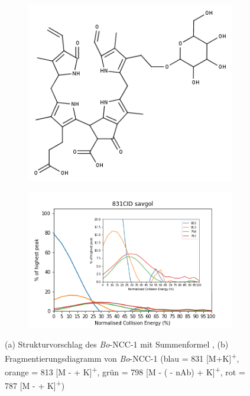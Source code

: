 \begin{figure}[!htbp]
  \begin{subfigure}[b]{0.5\textwidth}
    \includegraphics[width=\textwidth]{figures/Kapitel4/Kataboliten/fragmentation_structures/VWA_Katabolit_831.png}
    \caption{}
    \label{fig:831MKLeafspraystructure}
  \end{subfigure}
  \hfill
  \begin{subfigure}[b]{0.7\textwidth}
    \includegraphics[width=\textwidth]{figures/Kapitel4/Kataboliten/diags/831CID-savgol.png}
    \caption{}
    \label{fig:831MKLeafspraydiags}
  \end{subfigure}
  \caption[Strukturvorschlag von \textit{Bo}-NCC-1 und Fragmentierungsdiagramm, Quelle: Autor]{(a) Strukturvorschlag des \textit{Bo}-NCC-1 mit Summenformel , (b) Fragmentierungsdiagramm von \textit{Bo}-NCC-1 (blau = 831 [M+K]\textsuperscript{+}, orange = 813 [M -  + K]\textsuperscript{+}, grün = 798 [M - ( - \gls{nAb}) + K]\textsuperscript{+}, rot = 787 [M -  + K]\textsuperscript{+})}
\end{figure}



